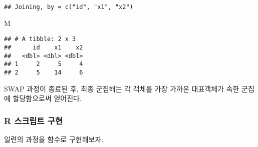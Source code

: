 \documentclass[]{book}
\newenvironment{Shaded}{\begin{snugshade}}{\end{snugshade}}
\newcommand{\NormalTok}[1]{#1}
\begin{document}
\begin{verbatim}
## Joining, by = c("id", "x1", "x2")
\end{verbatim}

\begin{Shaded}
\begin{Highlighting}[]
\NormalTok{M}
\end{Highlighting}
\end{Shaded}

\begin{verbatim}
## # A tibble: 2 x 3
##      id    x1    x2
##   <dbl> <dbl> <dbl>
## 1     2     5     4
## 2     5    14     6
\end{verbatim}

SWAP 과정이 종료된 후, 최종 군집해는 각 객체를 가장 가까운 대표객체가 속한 군집에 할당함으로써 얻어진다.

\hypertarget{pam-user-defined-functions}{%
\subsubsection{R 스크립트 구현}\label{pam-user-defined-functions}}

일련의 과정을 함수로 구현해보자.
\end{document}
